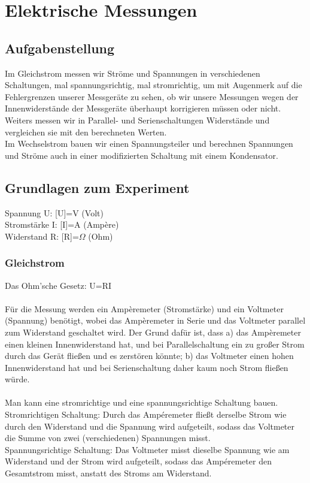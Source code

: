 \documentclass{article}
\begin{document}
\section{Elektrische Messungen}
\subsection{Aufgabenstellung}
Im Gleichstrom messen wir Ströme und Spannungen in verschiedenen Schaltungen, mal spannungsrichtig, mal stromrichtig, um mit Augenmerk auf die Fehlergrenzen unserer Messgeräte zu sehen, ob wir unsere Messungen wegen der Innenwiderstände der Messgeräte überhaupt korrigieren müssen oder nicht.\\
Weiters messen wir in Parallel- und Serienschaltungen Widerstände und vergleichen sie mit den berechneten Werten.\\
Im Wechselstrom bauen wir einen Spannungsteiler und berechnen Spannungen und Ströme auch in einer modifizierten Schaltung mit einem Kondensator.
\\
\subsection{Grundlagen zum Experiment}
Spannung U: [U]=V (Volt)\\
Stromstärke I: [I]=A (Ampère)\\
Widerstand R: [R]=$\Omega$ (Ohm)\\

\subsubsection*{Gleichstrom}
Das Ohm'sche Gesetz: U=RI\\
\\
Für die Messung werden ein Ampèremeter (Stromstärke) und ein Voltmeter (Spannung) benötigt, wobei das Ampèremeter in Serie und das Voltmeter parallel zum Widerstand geschaltet wird. Der Grund dafür ist, dass a) das Ampèremeter einen kleinen Innenwiderstand hat, und bei Parallelschaltung ein zu großer Strom durch das Gerät fließen und es zerstören könnte; b) das Voltmeter einen hohen Innenwiderstand hat und bei Serienschaltung daher kaum noch Strom fließen würde.\\
\\
Man kann eine stromrichtige und eine spannungsrichtige Schaltung bauen. \\
Stromrichtigen Schaltung: Durch das Ampéremeter fließt derselbe Strom wie durch den Widerstand und die Spannung wird aufgeteilt, sodass das Voltmeter die Summe von zwei (verschiedenen) Spannungen misst.\\
Spannungsrichtige Schaltung: Das Voltmeter misst dieselbe Spannung wie am Widerstand und der Strom wird aufgeteilt, sodass das Ampéremeter den Gesamtstrom misst, anstatt des Stroms am Widerstand.
\end{document}
